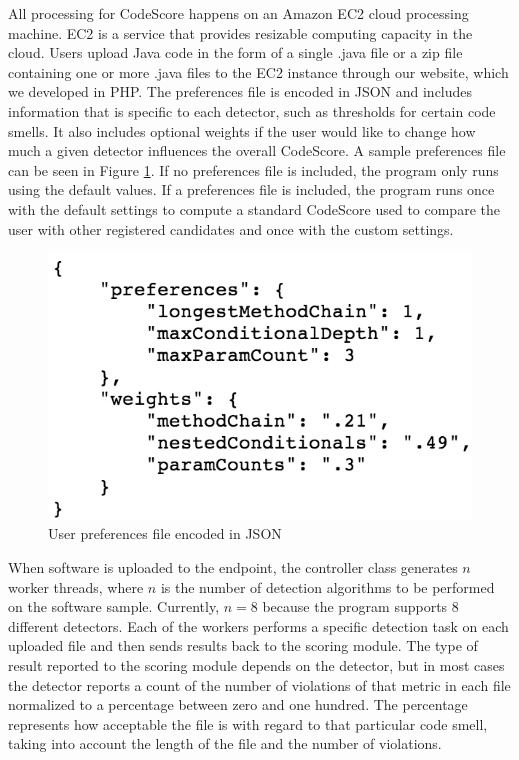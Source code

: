 \documentclass{sig-alternate}
\begin{document}
All processing for CodeScore happens on an Amazon EC2 cloud processing machine.
EC2 is a service that provides resizable computing capacity in the cloud. 
Users upload Java code in the form of a single .java file or a zip file
containing one or more .java files to the EC2 instance through our website, which
we developed in PHP. The preferences 
file is encoded in JSON and includes information that is specific to each detector, 
such as thresholds for certain code smells. It also includes optional weights if
the user would like to change how much a given detector influences the overall
CodeScore. A sample preferences file can be
seen in Figure \ref{fig: json}. If no preferences
file is included, the program only runs using the default values. If a
preferences file is included, the program runs once with the default settings to
compute a standard CodeScore used to compare the user with other registered candidates and
once with the custom settings. 

\begin{figure}[ht]
	\begin{center}
		\includegraphics[width=0.9\linewidth]{json}
	\end{center}
	\vspace{-12pt}
	\caption{User preferences file encoded in JSON}
	\label{fig: json}
\end{figure}

When software is uploaded to the endpoint, the controller class
generates $n$ worker threads, where $n$ is the number of detection algorithms to be
performed on the software sample. Currently, $n=8$ because the program supports $8$
different detectors. Each of the workers performs a specific detection task on
each uploaded file and then sends results back to the scoring module. The
type of result reported to the scoring module depends on the detector, but in
most cases the detector reports a count of the number of violations of that
metric in each file normalized to a percentage between zero and one hundred. The
percentage represents how acceptable the file is with regard to that particular
code smell, taking into account the length of the file and the number of
violations. 
\end{document}
